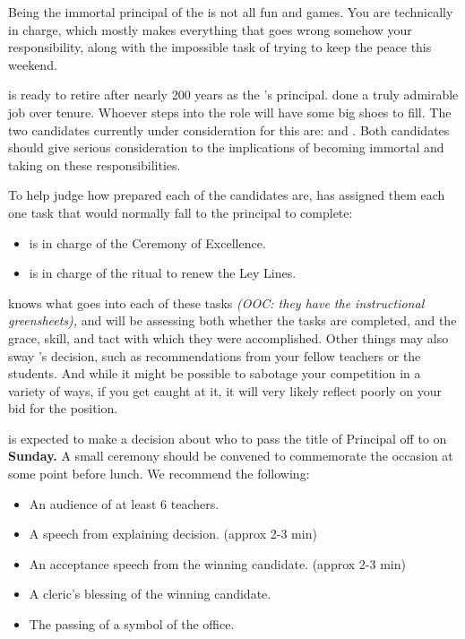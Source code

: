 \documentclass[green]{GL2020}
\begin{document}
\name{\gAssassinateWarlord{}}

Being the immortal principal of the \pSchool{} is not all fun and games. You are technically in charge, which mostly makes everything that goes wrong somehow your responsibility, along with the impossible task of trying to keep the peace this weekend.

\cPrincipal{\\full} is ready to retire after nearly 200 years as the \pSc{}’s principal. \cPrincipal{\They}  done a truly admirable job over \cPrincipal{\their} tenure. Whoever steps into the role will have some big shoes to fill. The two candidates currently under consideration for this are: \cMusic{\full} and \cBeetle{\full}. Both candidates should give serious consideration to the implications of becoming immortal and taking on these responsibilities.

To help judge how prepared each of the candidates are, \cPrincipal{} has assigned them each one task that would normally fall to the principal to complete:
\begin{itemize}
  \item \cMusic{} is in charge of the Ceremony of Excellence.
  \item \cBeetle{} is in charge of the ritual to renew the Ley Lines.
\end{itemize}

\cPrincipal{} knows what goes into each of these tasks \emph{(OOC: they have the instructional greensheets),} and will be assessing both whether the tasks are completed, and the grace, skill, and tact with which they were accomplished. Other things may also sway \cPrincipal{}’s decision, such as recommendations from your fellow teachers or the students. And while it might be possible to sabotage your competition in a variety of ways, if you get caught at it, it will very likely reflect poorly on your bid for the position.

\cPrincipal{} is expected to make a decision about who to pass the title of Principal off to on \textbf{Sunday.} A small ceremony should be convened to commemorate the occasion at some point before lunch. We recommend the following:
\begin{itemize}
  \item An audience of at least 6 teachers.
  \item A speech from \cPrincipal{} explaining \cPrincipal{\their} decision. (approx 2-3 min)
  \item An acceptance speech from the winning candidate. (approx 2-3 min)
  \item A cleric’s blessing of the winning candidate.
  \item The passing of a symbol of the office.
\end{itemize}
\end{document}
